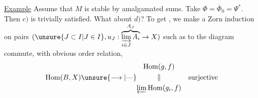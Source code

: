 \uline{Example} Assume that $M$ is stable by amalgamated sums.
Take $\Phi=\overline\Phi_0=\Psi^*$. Then $c)$  is trivially satisfied.
What about $d)$? To get  , we make a Zorn induction on pairs $(\unsure{J\subset I|J\in I},u_J:\overbrace{\varinjlim_{i\in J}A_i}^{A_J}\to X)$  such as to the diagram
commute, with obvious order relation, 
\[
\operatorname{Hom}(B,X)\unsure{\longrightarrow|\text{---}}\begin{gathered}\operatorname{Hom}(g,f)\\\Vert\\\varprojlim\operatorname{Hom}(g_i,f)\end{gathered}\quad\text{surjective}
\]

